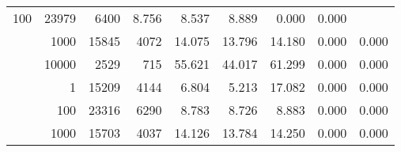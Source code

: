 \begin{table}
\begin{tabular}{rrrrrrrrr}
					\multirow{ 1 }{*}{ 100 } &
					
						
							    
							     23979  & 6400  
	                           & 8.756 & 8.537 & 8.889
	                           & 0.000 & 0.000  \\
	                
	            
					 &  
					 
					\multirow{ 1 }{*}{ 1000 } &
					
						
							    
							     15845  & 4072  
	                           & 14.075 & 13.796 & 14.180
	                           & 0.000 & 0.000  \\
	                
	            
					 &  
					 
					\multirow{ 1 }{*}{ 10000 } &
					
						
							    
							     2529  & 715  
	                           & 55.621 & 44.017 & 61.299
	                           & 0.000 & 0.000  \\
	                
	            
	        
				\noalign{\smallskip}\hline
				\multirow{ 4 }{*}{ 250000 } &
				
					
					 
					\multirow{ 1 }{*}{ 1 } &
					
						
							    
							     15209  & 4144  
	                           & 6.804 & 5.213 & 17.082
	                           & 0.000 & 0.000  \\
	                
	            
					 &  
					 
					\multirow{ 1 }{*}{ 100 } &
					
						
							    
							     23316  & 6290  
	                           & 8.783 & 8.726 & 8.883
	                           & 0.000 & 0.000  \\
	                
	            
					 &  
					 
					\multirow{ 1 }{*}{ 1000 } &
					
						
							    
							     15703  & 4037  
	                           & 14.126 & 13.784 & 14.250
	                           & 0.000 & 0.000  \\
	                

\end{tabular}
\end{table}

